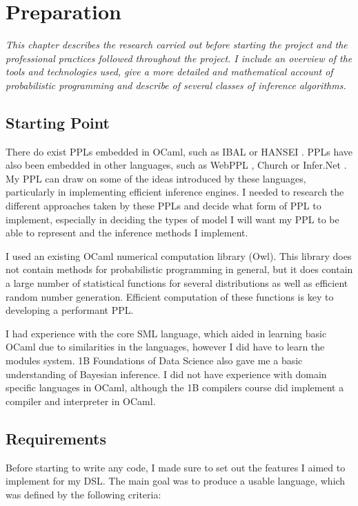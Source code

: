 \chapter{Preparation}

\textit{This chapter describes the research carried out before starting the project and the professional practices followed throughout the project. I include an overview of the tools and technologies used, give a more detailed and mathematical account of probabilistic programming and describe of several classes of inference algorithms.}

\section{Starting Point}

There do exist PPLs embedded in OCaml, such as IBAL \cite{ibal} or HANSEI \cite{kiselyov2009embedded}. PPLs have also been embedded in other languages, such as WebPPL \cite{mobus2018structure}, Church \cite{goodman2012church} or Infer.Net \cite{wang2011using}. My PPL can draw on some of the ideas introduced by these languages, particularly in implementing efficient inference engines. I needed to research the different approaches taken by these PPLs and decide what form of PPL to implement, especially in deciding the types of model I will want my PPL to be able to represent and the inference methods I implement.

I used an existing OCaml numerical computation library (Owl). This library does not contain methods for probabilistic programming in general, but it does contain a large number of statistical functions for several distributions as well as efficient random number generation. Efficient computation of these functions is key to developing a performant PPL. 

I had experience with the core SML language, which aided in learning basic OCaml due to similarities in the languages, however I did have to learn the modules system. 1B Foundations of Data Science also gave me a basic understanding of Bayesian inference. I did not have experience with domain specific languages in OCaml, although the 1B compilers course did implement a compiler and interpreter in OCaml.

\section{Requirements}

Before starting to write any code, I made sure to set out the features I aimed to implement for my DSL. The main goal was to produce a usable language, which was defined by the following criteria:

